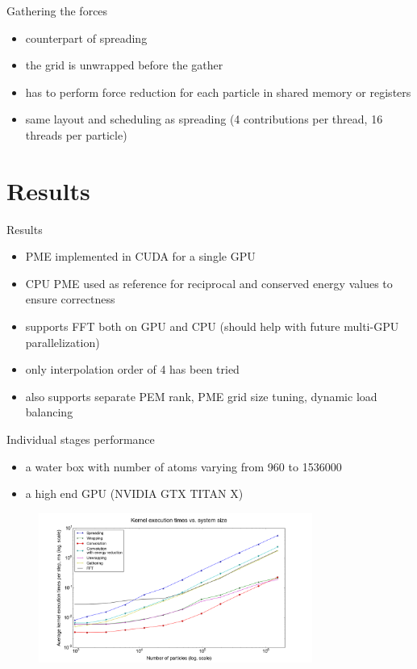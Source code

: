\documentclass[11pt]{beamer}
\begin{document}
\begin{frame}{Gathering the forces}
\begin{itemize}
\item counterpart of spreading
\item the grid is unwrapped before the gather
\item has to perform force reduction for each particle in shared memory or registers
\item same layout and scheduling as spreading (4 contributions per thread, 16 threads per particle)
\end{itemize}
\end{frame}

\section{Results}
\begin{frame}{Results}
\begin{itemize}
\item PME implemented in CUDA for a single GPU
\item CPU PME used as reference for reciprocal and conserved energy values to ensure correctness
\item supports FFT both on GPU and CPU (should help with future multi-GPU parallelization) 
\item only interpolation order of 4 has been tried
\item also supports separate PEM rank, PME grid size tuning, dynamic load balancing
\end{itemize}
\end{frame}

\begin{frame}{Individual stages performance}
\begin{itemize}
\item a water box with number of atoms varying from 960 to 1536000
\item a high end GPU (NVIDIA GTX TITAN X) 
\end{itemize}
\begin{figure}
    \includegraphics[width=0.8\textwidth]{pics/kernels-noconcur-2.png}
    \label{fig:kernels}
\end{figure}
\end{frame}
\end{document}
